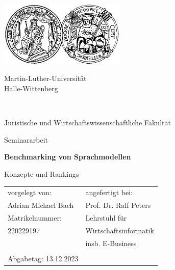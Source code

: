 \thispagestyle{empty} %
\begin{center}
    \includegraphics[width=6cm]{Formalien/mlu_logo.jpg}
    \vspace*{-1cm}
    \begin{spacing}{1.75}
        \begin{huge}
            Martin-Luther-Universität\\
            Halle-Wittenberg
        \end{huge}\\
        \vspace*{-0.2cm}
        \begin{Large}
            Juristische und Wirtschaftswissenschaftliche Fakultät
        \end{Large}
    \end{spacing}
    \vspace*{2cm}
    \begin{spacing}{0.95}
        \begin{Large}
            Seminararbeit\\
        \end{Large}
    \end{spacing}
    \vspace*{2cm}
    \begin{LARGE}
        \textbf{Benchmarking von Sprachmodellen}\\
    \end{LARGE}
    \vspace*{0.3cm}
    \begin{spacing}{1.6}
        \begin{large}
            Konzepte und Rankings
        \end{large}
    \end{spacing}
    \vspace*{2cm}
    \begin{table}[htbp]
        \centering
        \begin{tabular}{p{9.25cm}p{4.68cm}}
            vorgelegt von:        & angefertigt bei:      \\
            Adrian Michael Bach   & Prof. Dr. Ralf Peters \\
            Matrikelnummer:       & Lehrstuhl für         \\
            220229197             & Wirtschaftsinformatik \\
                                  & insb. E-Business      \\
                                  &                       \\
            Abgabetag: 13.12.2023 &                       \\
        \end{tabular}
    \end{table}
\end{center}
\newpage
